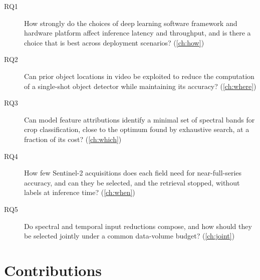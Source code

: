 \begin{description}
  \item[RQ1] How strongly do the choices of deep learning software framework and
  hardware platform affect inference latency and throughput, and is there a
  choice that is best across deployment scenarios? (\cref{ch:how})
  \item[RQ2] Can prior object locations in video be exploited to reduce the
  computation of a single-shot object detector while maintaining its accuracy?
  (\cref{ch:where})
  \item[RQ3] Can model feature attributions identify a minimal set of spectral
  bands for crop classification, close to the optimum found by exhaustive
  search, at a fraction of its cost? (\cref{ch:which})
  \item[RQ4] How few Sentinel-2 acquisitions does each field need for
  near-full-series accuracy, and can they be selected, and the retrieval
  stopped, without labels at inference time? (\cref{ch:when})
  \item[RQ5] Do spectral and temporal input reductions compose, and how should
  they be selected jointly under a common data-volume budget? (\cref{ch:joint})
\end{description}

\section{Contributions}
\label{sec:intro:contrib}

